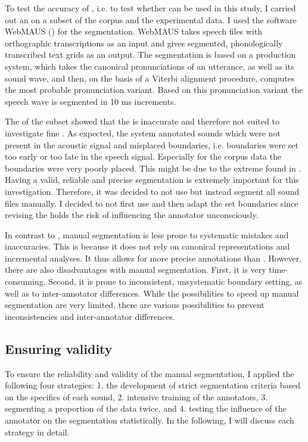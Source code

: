 To test the accuracy of , i.e. to test whether  can be used in this study, I carried out an  on a subset of the corpus and the experimental data. I used the software WebMAUS (\citealt{Schiel.1999,Kisler.2016}) for the segmentation.  WebMAUS takes speech files with orthographic transcriptions as an input and gives segmented, phonologically transcribed text grids as an output. The segmentation is based on a production system, which takes the canonical pronunciations of an utterance, as well as its sound wave, and then, on the basis of a Viterbi alignment procedure, computes the most probable pronunciation variant. Based on this pronunciation variant the speech wave is segmented in 10 ms increments. 
 
 
 The  of the subset showed that the  is inaccurate and therefore not suited to investigate fine . As expected, the system annotated sounds which were not present in the acoustic signal and misplaced boundaries, i.e. boundaries were set too early or too late in the speech signal. Especially for the corpus data the boundaries were very poorly placed. This might be due to the extreme  found in . 
 Having a valid, reliable and precise segmentation is extremely important for this investigation. Therefore, it was decided to not use  but instead segment all sound files manually. I decided to not first use  and then adapt the set boundaries since revising the  holds the risk of influencing the annotator unconsciously. 
 

In contrast to , manual segmentation is less prone to systematic mistakes and inaccuracies. This is because it does not rely on canonical representations and incremental analyses. It thus allows for more precise annotations than .  However, there are also disadvantages with manual segmentation. 
First, it is very time-consuming. Second, it is prone to inconsistent, unsystematic boundary setting, as well as to inter-annotator differences. While the possibilities to speed up manual segmentation are very limited, there are various possibilities to prevent inconsistencies and inter-annotator differences. 
\subsection{Ensuring validity}
To ensure the reliability and validity of the manual segmentation, I applied the following four strategies: 1.  the development of strict segmentation criteria based on the specifics of each sound, 2.  intensive training of the annotators, 3. segmenting a proportion of the data twice, and 4. testing the influence of the annotator on the segmentation statistically. In the following, I will discuss each strategy in detail.


